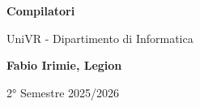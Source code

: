 \begin{titlepage}
	\begin{center}
		\vspace*{1cm}

		\Huge
		\textbf{Compilatori}

		\vspace{0.5cm}
		\LARGE
		UniVR - Dipartimento di Informatica

		\vspace{1.5cm}

		\textbf{Fabio Irimie, Legion}

		\vfill


		\vspace{0.8cm}


		2° Semestre 2025/2026

	\end{center}
\end{titlepage}

